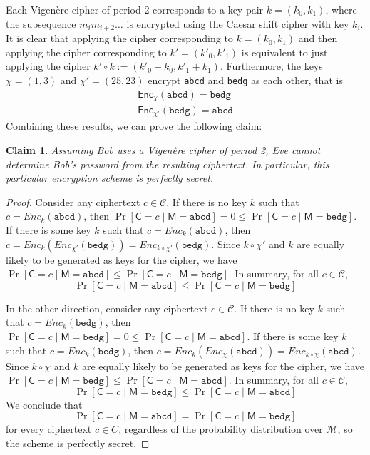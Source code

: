 \documentclass[12pt]{article}
\numberwithin{equation}{section}
\theoremstyle{plain}
\newtheorem{claim}{Claim}
\DeclareMathOperator*{\prob}{Pr}
\newcommand{\given}{\mid}
\newcommand{\ctexts}{\mathcal{C}}
\newcommand{\ctext}{\algo{C}}
\newcommand{\ptexts}{\mathcal{M}}
\newcommand{\ptext}{\algo{M}}
\newcommand{\algo}[1]{\mathsf{#1}}
\newcommand{\enc}{\algo{Enc}}
\begin{document}
Each Vigen\`ere cipher of period 2 corresponds to a key pair $k = (k_0, k_1)$,
where the subsequence $m_im_{i+2}\ldots$
is encrypted using the Caesar shift cipher with key $k_i$.
It is clear that applying the cipher corresponding to $k = (k_0, k_1)$
and then applying the cipher corresponding to $k' = (k'_0, k'_1)$
is equivalent to just applying the cipher $k' \circ k := (k'_0 + k_0, k'_1 + k_1)$.
Furthermore, the keys $\chi = (1, 3)$ and $\chi' = (25, 23)$
encrypt \texttt{abcd} and \texttt{bedg} as each other, that is
\begin{gather*}
    \enc_{\chi}(\texttt{abcd}) = \texttt{bedg}\\
    \enc_{\chi'}(\texttt{bedg}) = \texttt{abcd}
\end{gather*}
Combining these results, we can prove the following claim:
\begin{claim}\label{claim:period-2-secure}
Assuming Bob uses a Vigen\`ere cipher of period 2,
Eve cannot determine Bob's password from the resulting ciphertext.
In particular, this particular encryption scheme is perfectly secret.
\end{claim}
\begin{proof}
Consider any ciphertext $c \in \ctexts$.
If there is no key $k$ such that $c = Enc_k(\texttt{abcd})$,
then $\prob[\ctext = c \given \ptext = \texttt{abcd}] = 0 \leq \prob[\ctext = c \given \ptext = \texttt{bedg}]$.
If there is some key $k$ such that $c = Enc_k(\texttt{abcd})$,
then $c = Enc_k(Enc_{\chi'}(\texttt{bedg})) = Enc_{k \circ \chi'}(\texttt{bedg})$.
Since $k \circ \chi'$ and $k$ are equally likely to be generated as keys for the cipher,
we have $\prob[\ctext = c \given \ptext = \texttt{abcd}] \leq \prob[\ctext = c \given \ptext = \texttt{bedg}]$.
In summary, for all $c \in \ctexts$,
\begin{equation*}
    \prob[\ctext = c \given \ptext = \texttt{abcd}] \leq \prob[\ctext = c \given \ptext = \texttt{bedg}]
\end{equation*}

In the other direction, consider any ciphertext $c \in \ctexts$.
If there is no key $k$ such that $c = Enc_k(\texttt{bedg})$,
then $\prob[\ctext = c \given \ptext = \texttt{bedg}] = 0 \leq \prob[\ctext = c \given \ptext = \texttt{abcd}]$.
If there is some key $k$ such that $c = Enc_k(\texttt{bedg})$,
then $c = Enc_k(Enc_{\chi}(\texttt{abcd})) = Enc_{k \circ \chi}(\texttt{abcd})$.
Since $k \circ \chi$ and $k$ are equally likely to be generated as keys for the cipher,
we have $\prob[\ctext = c \given \ptext = \texttt{bedg}] \leq \prob[\ctext = c \given \ptext = \texttt{abcd}]$.
In summary, for all $c \in \ctexts$,
\begin{equation*}
    \prob[\ctext = c \given \ptext = \texttt{bedg}] \leq \prob[\ctext = c \given \ptext = \texttt{abcd}]
\end{equation*}
We conclude that
\begin{equation*}
    \prob[\ctext = c \given \ptext = \texttt{abcd}] = \prob[\ctext = c \given \ptext = \texttt{bedg}]
\end{equation*}
for every ciphertext $c \in C$,
regardless of the probability distribution over $\ptexts$,
so the scheme is perfectly secret.
\end{proof}
\end{document}
